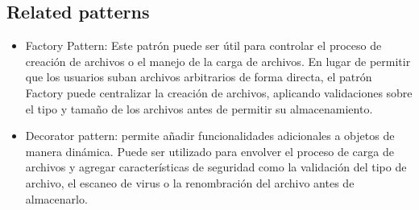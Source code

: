 \subsection{Related patterns}
\begin{itemize}
    \item Factory Pattern: Este patrón puede ser útil para controlar el proceso de creación de archivos o el manejo de la carga de archivos. En lugar de permitir que los usuarios suban archivos arbitrarios de forma directa, el patrón Factory puede centralizar la creación de archivos, aplicando validaciones sobre el tipo y tamaño de los archivos antes de permitir su almacenamiento.
    \item Decorator pattern: permite añadir funcionalidades adicionales a objetos de manera dinámica. Puede ser utilizado para envolver el proceso de carga de archivos y agregar características de seguridad como la validación del tipo de archivo, el escaneo de virus o la renombración del archivo antes de almacenarlo.
\end{itemize}



